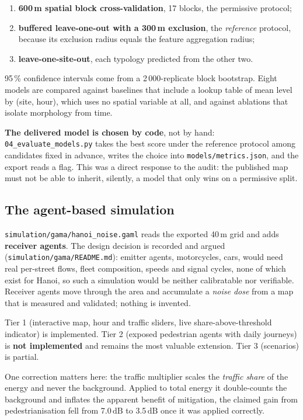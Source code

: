 \documentclass[11pt,a4paper]{article}
\newcommand{\dB}{\ensuremath{\,\mathrm{dB}}}
\newcommand{\pth}[1]{\texttt{\small #1}}
\begin{document}
\begin{enumerate}
 \item \textbf{600\,m spatial block cross-validation}, 17 blocks, the
 permissive protocol;
 \item \textbf{buffered leave-one-out with a 300\,m exclusion}, the
 \emph{reference} protocol, because its exclusion radius equals the
 feature aggregation radius;
 \item \textbf{leave-one-site-out}, each typology predicted from the other
 two.
\end{enumerate}

95\,\% confidence intervals come from a 2\,000-replicate block bootstrap. Eight
models are compared against baselines that include a lookup table of mean level
by (site, hour), which uses no spatial variable at all, and against ablations
that isolate morphology from time.

\textbf{The delivered model is chosen by code}, not by hand:
\pth{04\_evaluate\_models.py} takes the best score under the reference protocol
among candidates fixed in advance, writes the choice into
\pth{models/metrics.json}, and the export reads a flag. This was a direct
response to the audit: the published map must not be able to inherit, silently, a
model that only wins on a permissive split.

\subsection{The agent-based simulation}

\pth{simulation/gama/hanoi\_noise.gaml} reads the exported 40\,m grid and adds
\textbf{receiver agents}. The design decision is recorded and argued
(\pth{simulation/gama/README.md}): emitter agents, motorcycles, cars, would
need real per-street flows, fleet composition, speeds and signal cycles, none of
which exist for Hanoi, so such a simulation would be neither calibratable nor
verifiable. Receiver agents move through the area and accumulate a \emph{noise
dose} from a map that is measured and validated; nothing is invented.

Tier 1 (interactive map, hour and traffic sliders, live share-above-threshold
indicator) is implemented. Tier 2 (exposed pedestrian agents with daily
journeys) is \textbf{not implemented} and remains the most valuable extension.
Tier 3 (scenarios) is partial.

One correction matters here: the traffic multiplier scales the
\emph{traffic share} of the energy and never the background. Applied to total
energy it double-counts the background and inflates the apparent benefit of
mitigation, the claimed gain from pedestrianisation fell from 7.0\dB{} to
3.5\dB{} once it was applied correctly.
\end{document}
